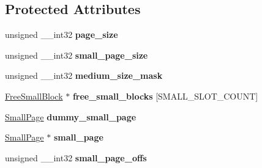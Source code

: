 \subsection*{Protected Attributes}
\begin{DoxyCompactItemize}
\item 
unsigned \+\_\+\+\_\+int32 {\bfseries page\+\_\+size}\hypertarget{class_object_script_1_1_o_s_heap_manager_afb5781ff18b9d7cc5b8609b5838a01c9}{}\label{class_object_script_1_1_o_s_heap_manager_afb5781ff18b9d7cc5b8609b5838a01c9}

\item 
unsigned \+\_\+\+\_\+int32 {\bfseries small\+\_\+page\+\_\+size}\hypertarget{class_object_script_1_1_o_s_heap_manager_a75d3933d02af01909547c95687d9696c}{}\label{class_object_script_1_1_o_s_heap_manager_a75d3933d02af01909547c95687d9696c}

\item 
unsigned \+\_\+\+\_\+int32 {\bfseries medium\+\_\+size\+\_\+mask}\hypertarget{class_object_script_1_1_o_s_heap_manager_aa4633e8f34344cb5e1c6aed8cf01b7db}{}\label{class_object_script_1_1_o_s_heap_manager_aa4633e8f34344cb5e1c6aed8cf01b7db}

\item 
\hyperlink{struct_object_script_1_1_o_s_heap_manager_1_1_free_small_block}{Free\+Small\+Block} $\ast$ {\bfseries free\+\_\+small\+\_\+blocks} \mbox{[}S\+M\+A\+L\+L\+\_\+\+S\+L\+O\+T\+\_\+\+C\+O\+U\+NT\mbox{]}\hypertarget{class_object_script_1_1_o_s_heap_manager_abcf645c00f3e752e6a4ee89d00ba2085}{}\label{class_object_script_1_1_o_s_heap_manager_abcf645c00f3e752e6a4ee89d00ba2085}

\item 
\hyperlink{struct_object_script_1_1_o_s_heap_manager_1_1_small_page}{Small\+Page} {\bfseries dummy\+\_\+small\+\_\+page}\hypertarget{class_object_script_1_1_o_s_heap_manager_a01d15087442c73f3f32b7560023e00a5}{}\label{class_object_script_1_1_o_s_heap_manager_a01d15087442c73f3f32b7560023e00a5}

\item 
\hyperlink{struct_object_script_1_1_o_s_heap_manager_1_1_small_page}{Small\+Page} $\ast$ {\bfseries small\+\_\+page}\hypertarget{class_object_script_1_1_o_s_heap_manager_aa4dfb3f42bfad675fe85b83d8ad21f47}{}\label{class_object_script_1_1_o_s_heap_manager_aa4dfb3f42bfad675fe85b83d8ad21f47}

\item 
unsigned \+\_\+\+\_\+int32 {\bfseries small\+\_\+page\+\_\+offs}\hypertarget{class_object_script_1_1_o_s_heap_manager_a3457b1c42fdccfc254852932f1975906}{}\label{class_object_script_1_1_o_s_heap_manager_a3457b1c42fdccfc254852932f1975906}


\end{DoxyCompactItemize}
